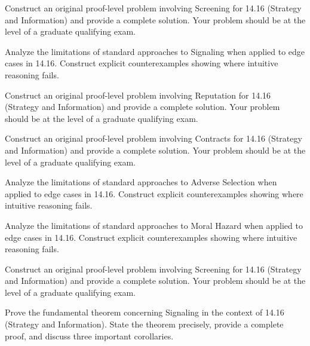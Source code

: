 \documentclass[12pt,a4paper]{exam}
\begin{document}
\begin{questions}
\vspace{0.3cm}

\question[5]
Construct an original proof-level problem involving Screening for 14.16 (Strategy and Information) and provide a complete solution. Your problem should be at the level of a graduate qualifying exam.

\vspace{0.3cm}

\question[5]
Analyze the limitations of standard approaches to Signaling when applied to edge cases in 14.16. Construct explicit counterexamples showing where intuitive reasoning fails.

\vspace{0.3cm}

\question[5]
Construct an original proof-level problem involving Reputation for 14.16 (Strategy and Information) and provide a complete solution. Your problem should be at the level of a graduate qualifying exam.

\vspace{0.3cm}

\question[7]
Construct an original proof-level problem involving Contracts for 14.16 (Strategy and Information) and provide a complete solution. Your problem should be at the level of a graduate qualifying exam.

\vspace{0.3cm}

\question[2]
Analyze the limitations of standard approaches to Adverse Selection when applied to edge cases in 14.16. Construct explicit counterexamples showing where intuitive reasoning fails.

\vspace{0.3cm}

\question[3]
Analyze the limitations of standard approaches to Moral Hazard when applied to edge cases in 14.16. Construct explicit counterexamples showing where intuitive reasoning fails.

\vspace{0.3cm}

\question[4]
Construct an original proof-level problem involving Screening for 14.16 (Strategy and Information) and provide a complete solution. Your problem should be at the level of a graduate qualifying exam.

\vspace{0.3cm}

\question[3]
Prove the fundamental theorem concerning Signaling in the context of 14.16 (Strategy and Information). State the theorem precisely, provide a complete proof, and discuss three important corollaries.


\end{questions}
\end{document}
